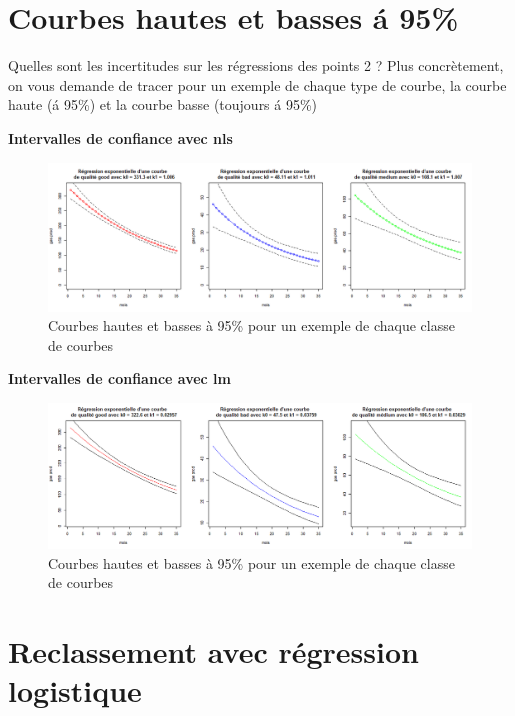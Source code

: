 \documentclass[12pt]{article}
\begin{document}
\newpage

\section{Courbes hautes et basses \'a 95\%}

Quelles sont les incertitudes sur les r\'egressions des points 2 ? Plus concr\`etement, on
vous demande de tracer pour un exemple de chaque type de courbe, la courbe haute (\'a
95\%) et la courbe basse (toujours \'a 95\%)

\textbf{Intervalles de confiance avec nls}

\begin{figure}[H]
 \centering %
	\includegraphics[width=450px]{q3_predict_nls}
  \caption{\label{fig:q3_predict_nls} Courbes hautes et basses à 95\% pour un exemple de chaque classe de courbes}
\end{figure}

\textbf{Intervalles de confiance avec lm}

\begin{figure}[H]
 \centering %
	\includegraphics[width=450px]{q3_predict_lm}
  \caption{\label{fig:q3_predict_lm} Courbes hautes et basses à 95\% pour un exemple de chaque classe de courbes}
\end{figure}


\newpage
\section{Reclassement avec r\'egression logistique}
 
\end{document}
